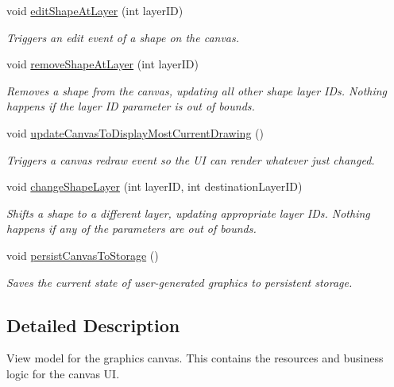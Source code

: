 \begin{DoxyCompactItemize}
void \mbox{\hyperlink{class_v_m_canvas_a6eeef544d176c394bad40cecde432938}{edit\+Shape\+At\+Layer}} (int layer\+ID)
\begin{DoxyCompactList}\small\item\em Triggers an edit event of a shape on the canvas. \end{DoxyCompactList}\item 
void \mbox{\hyperlink{class_v_m_canvas_a58092a70072af434ce7f712eff21c187}{remove\+Shape\+At\+Layer}} (int layer\+ID)
\begin{DoxyCompactList}\small\item\em Removes a shape from the canvas, updating all other shape layer I\+Ds. Nothing happens if the layer ID parameter is out of bounds. \end{DoxyCompactList}\item 
void \mbox{\hyperlink{class_v_m_canvas_a66bc48cf35def60c67cb5ba06d31f2a8}{update\+Canvas\+To\+Display\+Most\+Current\+Drawing}} ()
\begin{DoxyCompactList}\small\item\em Triggers a canvas redraw event so the UI can render whatever just changed. \end{DoxyCompactList}\item 
void \mbox{\hyperlink{class_v_m_canvas_afaf8c4eae3d74035b250e95bd7d03ea3}{change\+Shape\+Layer}} (int layer\+ID, int destination\+Layer\+ID)
\begin{DoxyCompactList}\small\item\em Shifts a shape to a different layer, updating appropriate layer I\+Ds. Nothing happens if any of the parameters are out of bounds. \end{DoxyCompactList}\item 
\mbox{\label{class_v_m_canvas_a70ba23931f797c593346a8f5f9277488}} 
void \mbox{\hyperlink{class_v_m_canvas_a70ba23931f797c593346a8f5f9277488}{persist\+Canvas\+To\+Storage}} ()
\begin{DoxyCompactList}\small\item\em Saves the current state of user-\/generated graphics to persistent storage. \end{DoxyCompactList}\end{DoxyCompactItemize}


\subsection{Detailed Description}
View model for the graphics canvas. This contains the resources and business logic for the canvas UI. 



